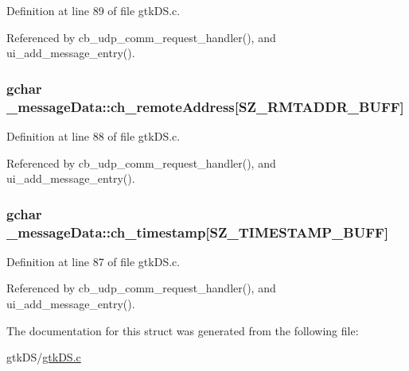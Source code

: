 Definition at line 89 of file gtk\+D\+S.\+c.



Referenced by cb\+\_\+udp\+\_\+comm\+\_\+request\+\_\+handler(), and ui\+\_\+add\+\_\+message\+\_\+entry().

\subsubsection[{\texorpdfstring{ch\+\_\+remote\+Address}{ch_remoteAddress}}]{\setlength{\rightskip}{0pt plus 5cm}gchar \+\_\+message\+Data\+::ch\+\_\+remote\+Address\mbox{[}{\bf S\+Z\+\_\+\+R\+M\+T\+A\+D\+D\+R\+\_\+\+B\+U\+FF}\mbox{]}}\hypertarget{struct__message_data_ad7d54fd9c1f9c0f8f6592ba194d6106f}{}\label{struct__message_data_ad7d54fd9c1f9c0f8f6592ba194d6106f}


Definition at line 88 of file gtk\+D\+S.\+c.



Referenced by cb\+\_\+udp\+\_\+comm\+\_\+request\+\_\+handler(), and ui\+\_\+add\+\_\+message\+\_\+entry().

\subsubsection[{\texorpdfstring{ch\+\_\+timestamp}{ch_timestamp}}]{\setlength{\rightskip}{0pt plus 5cm}gchar \+\_\+message\+Data\+::ch\+\_\+timestamp\mbox{[}{\bf S\+Z\+\_\+\+T\+I\+M\+E\+S\+T\+A\+M\+P\+\_\+\+B\+U\+FF}\mbox{]}}\hypertarget{struct__message_data_a34854aba2033bcf0a48c1915b84452bf}{}\label{struct__message_data_a34854aba2033bcf0a48c1915b84452bf}


Definition at line 87 of file gtk\+D\+S.\+c.



Referenced by cb\+\_\+udp\+\_\+comm\+\_\+request\+\_\+handler(), and ui\+\_\+add\+\_\+message\+\_\+entry().



The documentation for this struct was generated from the following file\+:\begin{DoxyCompactItemize}
\item 
gtk\+D\+S/\hyperlink{gtk_d_s_8c}{gtk\+D\+S.\+c}\end{DoxyCompactItemize}
